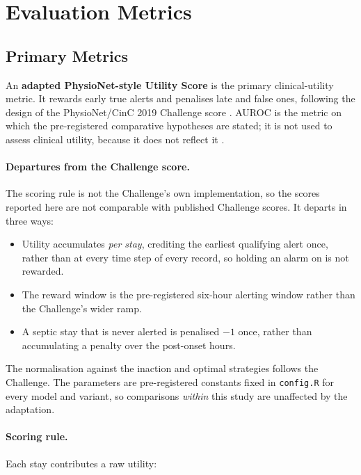 \section{Evaluation Metrics}
\label{sec:metrics}

\subsection{Primary Metrics}

An \textbf{adapted PhysioNet-style Utility Score} is the primary
clinical-utility metric. It rewards early true alerts and penalises late and
false ones, following the design of the PhysioNet/CinC 2019 Challenge score
\cite{reyna2020utility}. AUROC is the metric on which the pre-registered
comparative hypotheses are stated; it is not used to assess clinical utility,
because it does not reflect it \cite{wang2025srpm}.

\paragraph{Departures from the Challenge score.} The scoring rule is not the
Challenge's own implementation, so the scores reported here are not comparable
with published Challenge scores. It departs in three ways:

\begin{itemize}
    \item Utility accumulates \emph{per stay}, crediting the earliest
    qualifying alert once, rather than at every time step of every record, so
    holding an alarm on is not rewarded.
    \item The reward window is the pre-registered six-hour alerting window
    rather than the Challenge's wider ramp.
    \item A septic stay that is never alerted is penalised $-1$ once, rather
    than accumulating a penalty over the post-onset hours.
\end{itemize}

The normalisation against the inaction and optimal strategies follows the
Challenge. The parameters are pre-registered constants fixed in
\texttt{config.R} for every model and variant, so comparisons \emph{within}
this study are unaffected by the adaptation.

\paragraph{Scoring rule.} Each stay contributes a raw utility:

